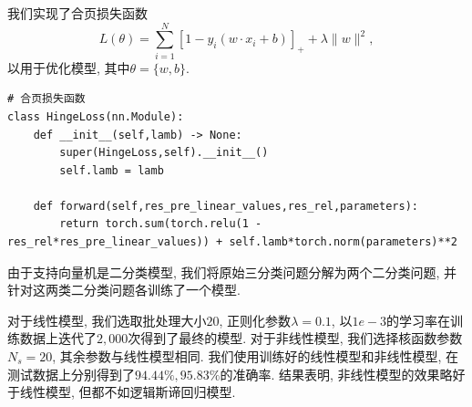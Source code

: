 我们实现了合页损失函数
\begin{equation}
    L(\theta) = \sum_{i=1}^{N}[1 - y_i(w\cdot x_i + b)]_{+} + \lambda\|w\|^2,
\end{equation}
以用于优化模型, 其中$\theta = \{w,b\}$.
\begin{lstlisting}
# 合页损失函数
class HingeLoss(nn.Module):
    def __init__(self,lamb) -> None:
        super(HingeLoss,self).__init__()
        self.lamb = lamb

    def forward(self,res_pre_linear_values,res_rel,parameters):
        return torch.sum(torch.relu(1 - res_rel*res_pre_linear_values)) + self.lamb*torch.norm(parameters)**2
\end{lstlisting}

由于支持向量机是二分类模型, 我们将原始三分类问题分解为两个二分类问题, 并针对这两类二分类问题各训练了一个模型.

对于线性模型, 我们选取批处理大小$20$, 正则化参数$\lambda = 0.1$, 以$1e-3$的学习率在训练数据上迭代了$2,000$次得到了最终的模型.
对于非线性模型, 我们选择核函数参数$N_s = 20$, 其余参数与线性模型相同.
我们使用训练好的线性模型和非线性模型, 在测试数据上分别得到了$94.44\%,95.83\%$的准确率.
结果表明, 非线性模型的效果略好于线性模型, 但都不如逻辑斯谛回归模型. 

